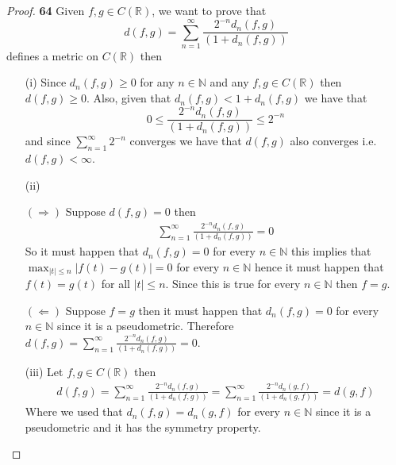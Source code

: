 \documentclass[11pt]{article}
\newcommand{\N}{\mathbb{N}}
\newcommand{\R}{\mathbb{R}}
\theoremstyle{definition}
\begin{document}
    \begin{proof}{\textbf{64}}
        Given $f,g \in C(\R)$, we want to prove that
        $$d(f,g) = \sum_{n=1}^{\infty}\frac{2^{-n}d_n(f,g)}{(1+d_n(f,g))}$$
        defines a metric on $C(\R)$ then
        \begin{itemize}
        \item [(i)] Since $d_n(f,g) \geq 0$ for any $n \in \N$ and any
        $f,g \in C(\R)$ then $d(f,g) \geq 0$.
        Also, given that $d_n(f,g) < 1 + d_n(f,g)$ we have that
        $$0 \leq \frac{2^{-n}d_n(f,g)}{(1+d_n(f,g))} \leq 2^{-n}$$
        and since $\sum_{n=1}^{\infty} 2^{-n}$ converges we have that $d(f,g)$
        also converges i.e. $d(f,g) < \infty$.

        \item [(ii)]
        
        $(\Rightarrow)$ Suppose $d(f,g) = 0$ then
        \begin{align*}
            \sum_{n=1}^{\infty}\frac{2^{-n}d_n(f,g)}{(1+d_n(f,g))} = 0
        \end{align*}
        So it must happen that $d_n(f,g) = 0$ for every $n \in \N$ this implies
        that $\max_{|t|\leq n} |f(t) - g(t)| = 0$  for every $n \in \N$ 
        hence it must happen that $f(t) = g(t)$ for all $|t| \leq n$.
        Since this is true for every $n \in \N$ then $f = g$.

        $(\Leftarrow)$ Suppose $f = g$ then it must happen that $d_n(f,g) = 0$
        for every $n \in \N$ since it is a pseudometric. Therefore
        $d(f,g) = \sum_{n=1}^{\infty}\frac{2^{-n}d_n(f,g)}{(1+d_n(f,g))} = 0$.

        \item [(iii)] Let $f,g \in C(\R)$ then
        \begin{align*}
            d(f,g) = \sum_{n=1}^{\infty}\frac{2^{-n}d_n(f,g)}{(1+d_n(f,g))}
            = \sum_{n=1}^{\infty}\frac{2^{-n}d_n(g,f)}{(1+d_n(g,f))} = d(g,f)
        \end{align*}
        Where we used that $d_n(f,g) = d_n(g,f)$ for every $n \in \N$ since it
        is a pseudometric and it has the symmetry property. 


\end{itemize}
\end{proof}
\end{document}
